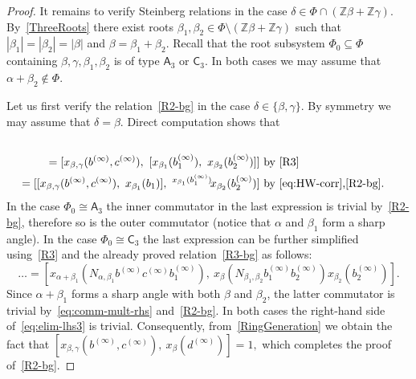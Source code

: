 \documentclass[oneside, 11pt]{amsart}
\numberwithin{equation}{section}
\theoremstyle{definition}
\theoremstyle{remark}
\newcommand{\ZZ}{\mathbb{Z}}
\newcommand{\up}[2]{{^{#1}\!{#2}}}
\newcommand{\rA}{\mathsf{A}}
\newcommand{\rC}{\mathsf{C}}
\begin{document}
\begin{proof}
 It remains to verify Steinberg relations in the case \(\delta \in \Phi \cap (\ZZ \beta + \ZZ \gamma)\).
 By~\cref{ThreeRoots} there exist roots \(\beta_1, \beta_2 \in \Phi \setminus (\ZZ \beta + \ZZ \gamma)\) such that \(|\beta_1| = |\beta_2| = |\beta|\) and \(\beta = \beta_1 + \beta_2\). 
 Recall that the root subsystem $\Phi_0 \subseteq \Phi$ containing $\beta,\gamma,\beta_1,\beta_2$ is of type $\rA_3$ or $\rC_3$. 
 In both cases we may assume that $\alpha + \beta_2 \not\in\Phi$.
 
 Let us first verify the relation~\eqref{R2-bg} in the case $\delta \in \{\beta, \gamma\}$. By symmetry we may assume that $\delta = \beta$. 
 Direct computation shows that
 \begin{align}
  [x_{\beta,\gamma}(b^{(\infty)}, c^{(\infty)}),\ x_\beta(N_{\beta_1, \beta_2} b_1^{(\infty)}b_2^{(\infty)})] \nonumber \\
   = [x_{\beta,\gamma}(b^{(\infty)}, c^{(\infty)}),\ [x_{\beta_1}(b_1^{(\infty)}),\ x_{\beta_2}(b_2^{(\infty)})]]  & \text{ by~\eqref{R3}} \label{eq:elim-lhs3} \\ 
   = [[x_{\beta, \gamma}(b^{(\infty)}, c^{(\infty)}),\ x_{\beta_1}(b_1)],\ \up{x_{\beta_1}(b_1^{(\infty)})} x_{\beta_2}(b_2^{(\infty)})]  & \text{ by~\eqref{eq:HW-corr},\eqref{R2-bg}.} \nonumber \end{align}
In the case $\Phi_0\cong \rA_3$ the inner commutator in the last expression is trivial by~\eqref{R2-bg},
 therefore so is the outer commutator (notice that $\alpha$ and $\beta_1$ form a sharp angle).
In the case $\Phi_0\cong \rC_3$ the last expression can be further simplified using~\eqref{R3} and the already proved relation~\eqref{R3-bg} as follows:
\[ \ldots = [x_{\alpha+\beta_1}(N_{\alpha, \beta_1} b^{(\infty)}c^{(\infty)}b_1^{(\infty)}),\ x_{\beta}(N_{\beta_1, \beta_2} b_1^{(\infty)} b_2^{(\infty)}) x_{\beta_2}(b_2^{(\infty)})]. \]
Since $\alpha+\beta_1$ forms a sharp angle with both $\beta$ and $\beta_2$, the latter commutator is trivial by~\eqref{eq:comm-mult-rhs} and~\eqref{R2-bg}.  
  In both cases the right-hand side of~\eqref{eq:elim-lhs3} is trivial. Consequently, from~\cref{RingGeneration} we obtain the fact that
 $[x_{\beta,\gamma}(b^{(\infty)}, c^{(\infty)}),\ x_\beta(d^{(\infty)})] = 1,$
 which completes the proof of~\eqref{R2-bg}. 
 

\end{proof}
\end{document}
